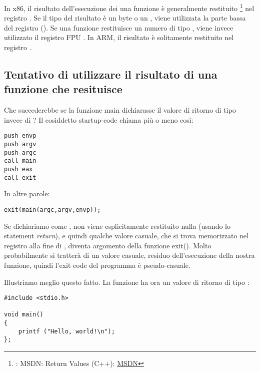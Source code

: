 

In x86, il risultato dell'esecuzione dei una funzione è generalmente restituito
\footnote{\Seealso: MSDN: Return Values (C++): \href{http://go.yurichev.com/17258}{MSDN}}
nel registro \EAX. 
Se il tipo del risultato è un byte o un \Tchar, viene utilizzata la parte bassa del registro \EAX (\AL). 
Se una funzione restituisce un numero di tipo \Tfloat, viene invece utilizzato il registro FPU .
In ARM, il risultato è solitamente restituito nel registro .

\subsection{Tentativo di utilizzare il risultato di una funzione che resituisce \Tvoid}
\label{UseResultOfVoidFunc}

Che succederebbe se la funzione main dichiarasse il valore di ritorno di tipo \Tvoid invece di \Tint?
Il cosiddetto startup-code chiama \main più o meno così:

\begin{lstlisting}[style=customasmx86]
push envp
push argv
push argc
call main
push eax
call exit
\end{lstlisting}

In altre parole:

\begin{lstlisting}[style=customc]
exit(main(argc,argv,envp));
\end{lstlisting}

Se dichiariamo \main come \Tvoid, non viene esplicitamente restituito nulla  (usando lo statement \emph{return}),
e quindi qualche valore casuale, che si trova memorizzato nel registro \EAX alla fine di \main, diventa argomento della funzione exit().
Molto probabilmente si tratterà di un valore casuale, residuo dell'esecuzione della nostra funzione, quindi l'exit code del programma 
è pseudo-casuale.
\par
Illustriamo meglio questo fatto. 
La funzione \main ha ora un valore di ritorno di tipo \Tvoid:

\begin{lstlisting}[style=customc]
#include <stdio.h>

void main()
{
	printf ("Hello, world!\n");
};
\end{lstlisting}

